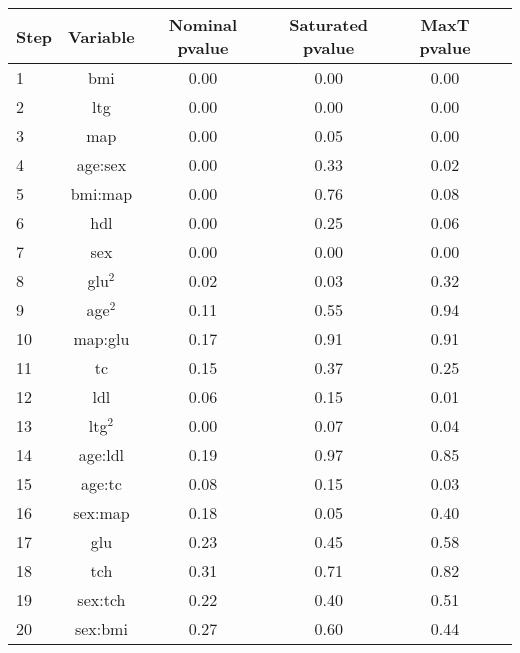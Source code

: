 \begin{tabular}{|l|c|c|c|c|c|}
\hline
 Step & Variable &  Nominal pvalue &  Saturated pvalue &  MaxT pvalue \\
\hline
    1 &      bmi &            0.00 &              0.00 &         0.00 \\
    2 &      ltg &            0.00 &              0.00 &         0.00 \\
    3 &      map &            0.00 &             {\color{red} 0.05} &         0.00 \\
    4 &  age:sex &            0.00 &              0.33 &         0.02 \\
    5 &  bmi:map &            0.00 &              0.76 &         0.08 \\
    6 &      hdl &            0.00 &              0.25 &         0.06 \\
    7 &      sex &            0.00 &              0.00 &         0.00 \\
    8 &    glu$^2$ &            0.02 &              0.03 &         {\color{red} 0.32} \\
    9 &    age$^2$ &            0.11 &              0.55 &         0.94 \\
   10 &  map:glu &            0.17 &              0.91 &         0.91 \\
   11 &       tc &            0.15 &              0.37 &         0.25 \\
   12 &      ldl &            0.06 &              0.15 &         0.01 \\
   13 &    ltg$^2$ &            0.00 &              0.07 &         0.04 \\
   14 &  age:ldl &            0.19 &              0.97 &         0.85 \\
   15 &   age:tc &            0.08 &              0.15 &         0.03 \\
   16 &  sex:map &            0.18 &              0.05 &         0.40 \\
   17 &      glu &            0.23 &              0.45 &         0.58 \\
   18 &      tch &       {\color{red}     0.31} &              0.71 &         0.82 \\
   19 &  sex:tch &            0.22 &              0.40 &         0.51 \\
   20 &  sex:bmi &            0.27 &              0.60 &         0.44 \\
\hline
\end{tabular}

